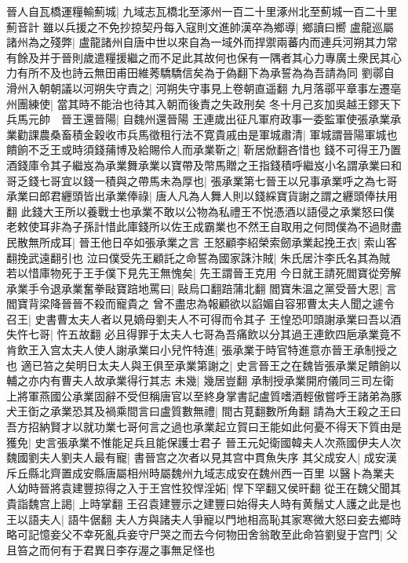 晉人自瓦橋運糧輸薊城|{
	九域志瓦橋北至涿州一百二十里涿州北至薊城一百二十里薊音計}
雖以兵援之不免抄掠契丹每入寇則文進帥漢卒為鄉導|{
	鄉讀曰嚮}
盧龍巡屬諸州為之殘弊|{
	盧龍諸州自唐中世以來自為一域外而捍禦兩蕃内而連兵河朔其力常有餘及并于晉則歲遣糧援繼之而不足此其故何也保有一隅者其心力專廣土衆民其心力有所不及也詩云無田甫田維莠驕驕信矣為于偽翻下為承誓為為吾請為同}
劉鄩自滑州入朝朝議以河朔失守責之|{
	河朔失守事見上卷朝直遥翻}
九月落鄩平章事左遷亳州團練使|{
	當其時不能治也待其入朝而後責之失政刑矣}
冬十月己亥加吳越王鏐天下兵馬元帥　晉王還晉陽|{
	自魏州還晉陽}
王連歲出征凡軍府政事一委監軍使張承業承業勸課農桑畜積金穀收市兵馬徵租行法不寛貴戚由是軍城肅清|{
	軍城謂晉陽軍城也}
饋餉不乏王或時須錢蒱博及給賜伶人而承業靳之|{
	靳居焮翻吝惜也}
錢不可得王乃置酒錢庫令其子繼岌為承業舞承業以寶帶及幣馬贈之王指錢積呼繼岌小名謂承業曰和哥乏錢七哥宜以錢一積與之帶馬未為厚也|{
	張承業第七晉王以兄事承業呼之為七哥}
承業曰郎君纒頭皆出承業俸祿|{
	唐人凡為人舞人則以錢綵寶貨謝之謂之纒頭俸扶用翻}
此錢大王所以養戰士也承業不敢以公物為私禮王不悦憑酒以語侵之承業怒曰僕老敕使耳非為子孫計惜此庫錢所以佐王成霸業也不然王自取用之何問僕為不過財盡民散無所成耳|{
	晉王他日卒如張承業之言}
王怒顧李紹榮索劒承業起挽王衣|{
	索山客翻挽武遠翻引也}
泣曰僕受先王顧託之命誓為國家誅汴賊|{
	朱氏居汴李氏名其為賊}
若以惜庫物死于王手僕下見先王無愧矣|{
	先王謂晉王克用}
今日就王請死閻寶從旁解承業手令退承業奮拳敺寶踣地罵曰|{
	敺烏口翻踣蒲北翻}
閻寶朱温之黨受晉大恩|{
	言閻寶背梁降晉晉不殺而寵貴之}
曾不盡忠為報顧欲以諂媚自容邪曹太夫人聞之遽令召王|{
	史書曹太夫人者以見嫡母劉夫人不可得而令其子}
王惶恐叩頭謝承業曰吾以酒失忤七哥|{
	忤五故翻}
必且得罪于太夫人七哥為吾痛飲以分其過王連飲四巵承業竟不肯飲王入宫太夫人使人謝承業曰小兒忤特進|{
	張承業于時官特進意亦晉王承制授之也}
適已笞之矣明日太夫人與王俱至承業第謝之|{
	史言晉王之在魏皆張承業足饋餉以輔之亦内有曹夫人故承業得行其志}
未幾|{
	幾居豈翻}
承制授承業開府儀同三司左衛上將軍燕國公承業固辭不受但稱唐官以至終身掌書記盧質嗜酒輕傲嘗呼王諸弟為豚犬王衘之承業恐其及禍乘間言曰盧質數無禮|{
	間古莧翻數所角翻}
請為大王殺之王曰吾方招納賢才以就功業七哥何言之過也承業起立賀曰王能如此何憂不得天下質由是獲免|{
	史言張承業不惟能足兵且能保護士君子}
晉王元妃衛國韓夫人次燕國伊夫人次魏國劉夫人劉夫人最有寵|{
	書晉宫之次者以見其宫中貫魚失序}
其父成安人|{
	成安漢斥丘縣北齊置成安縣唐屬相州時屬魏州九域志成安在魏州西一百里}
以醫卜為業夫人幼時晉將袁建豐掠得之入于王宫性狡悍淫妬|{
	悍下罕翻又侯旰翻}
從王在魏父聞其貴詣魏宫上謁|{
	上時掌翻}
王召袁建豐示之建豐曰始得夫人時有黄鬚丈人護之此是也王以語夫人|{
	語牛倨翻}
夫人方與諸夫人爭寵以門地相高恥其家寒微大怒曰妾去鄉時略可記憶妾父不幸死亂兵妾守尸哭之而去今何物田舍翁敢至此命笞劉叟于宫門|{
	父且笞之而何有于君異日李存渥之事無足怪也}
